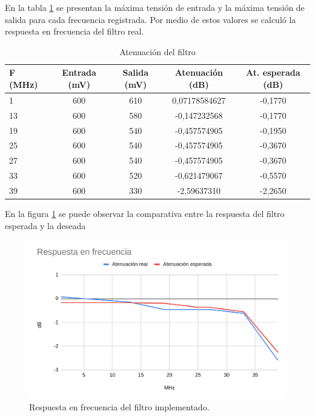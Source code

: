 \vspace{5mm}

En la tabla \ref{tab:tensiones} se presentan la máxima tensión de entrada y la máxima tensión de salida para cada frecuencia registrada. Por medio de estos valores se calculó la respuesta en frecuencia del filtro real. 

\begin{table}[h]
\centering
\caption[Antenuación del filtro]{Atenuación del filtro}
\begin{tabular*}{\textwidth}{l c c c c}
\toprule
\textbf{F (MHz)} & \textbf{Entrada (mV)} & \textbf{Salida (mV)} & \textbf{Atenuación (dB)} & \textbf{At. esperada (dB)}\\
\midrule
1 & 600 & 610 & 0,07178584627 & -0,1770 \\
13 & 600 & 580 & -0,147232568 & -0,1770 \\
19 & 600 & 540 & -0,457574905 & -0,1950 \\
25 & 600 & 540 & -0,457574905 & -0,3670 \\
27 & 600 & 540 & -0,457574905 & -0,3670 \\
33 & 600 & 520 & -0,621479067 & -0,5570 \\
39 & 600 & 330 & -2,59637310 & -2,2650 \\
\bottomrule
\hline
\end{tabular*}
\label{tab:tensiones}
\end{table}

\vspace{5mm}

En la figura \ref{fig:respFrecReal} se puede observar la comparativa entre la respuesta del filtro esperada y la deseada

\begin{figure}[ht]
	\centering
	\includegraphics[width=130mm]{./Figures/respFrecReal.png}
	\caption{Respuesta en frecuencia del filtro implementado.}
	\label{fig:respFrecReal}
\end{figure}


